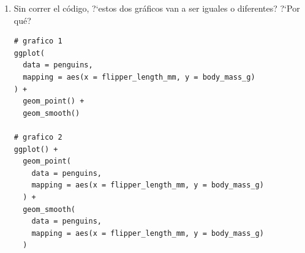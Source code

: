 \documentclass[a4paper,11pt]{article}
\theoremstyle{definition}
\begin{document}
\begin{enumerate}[resume]
\item Sin correr el c\'odigo, ?`estos dos gr\'aficos van a ser iguales o diferentes? ?`Por qu\'e?
\begin{lstlisting}
# grafico 1
ggplot(
  data = penguins,
  mapping = aes(x = flipper_length_mm, y = body_mass_g)
) +
  geom_point() +
  geom_smooth()

# grafico 2
ggplot() +
  geom_point(
    data = penguins,
    mapping = aes(x = flipper_length_mm, y = body_mass_g)
  ) +
  geom_smooth(
    data = penguins,
    mapping = aes(x = flipper_length_mm, y = body_mass_g)
  )
\end{lstlisting}

\end{enumerate}
\end{document}
